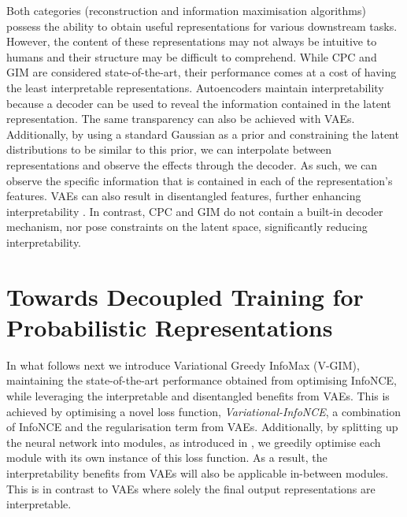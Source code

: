 		
		Both categories (reconstruction and information maximisation algorithms) possess the ability to obtain useful representations for various downstream tasks. However, the content of these representations may not always be intuitive to humans and their structure may be difficult to comprehend. While CPC and GIM are considered state-of-the-art, their performance comes at a cost of having the least interpretable representations. Autoencoders maintain interpretability because a decoder can be used to reveal the information contained in the latent representation. The same transparency can also be achieved with VAEs. Additionally, by using a standard Gaussian as a prior and constraining the latent distributions to be similar to this prior, we can interpolate between representations and observe the effects through the decoder. As such, we can observe the specific information that is contained in each of the representation's features. VAEs can also result in disentangled features, further enhancing interpretability \citep{grossuttiDeepLearningInfrared2022}. In contrast, CPC and GIM do not contain a built-in decoder mechanism, nor pose constraints on the latent space, significantly reducing interpretability.
		


\section{Towards Decoupled Training for Probabilistic Representations} \label{cha:vgim_decoupled_training_for_probabil_repr}
		In what follows next we introduce Variational Greedy InfoMax (V-GIM), maintaining the state-of-the-art performance obtained from optimising InfoNCE, while leveraging the interpretable and disentangled benefits from VAEs. This is achieved by optimising a novel loss function, \textit{Variational-InfoNCE}, a combination of InfoNCE and the regularisation term from VAEs. Additionally, by splitting up the neural network into modules, as introduced in \citep{lowePuttingEndEndtoEnd2020a}, we greedily optimise each module with its own instance of this loss function. As a result, the interpretability benefits from VAEs will also be applicable in-between modules. This is in contrast to VAEs where solely the final output representations are interpretable.		
				
		
